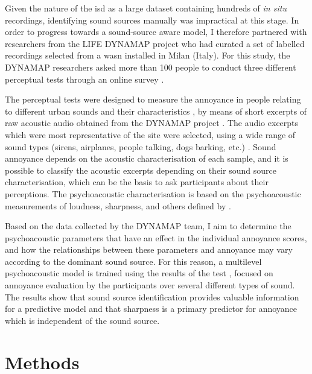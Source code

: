 Given the nature of the \gls{isd} as a large dataset containing hundreds of \emph{in situ} recordings, identifying sound sources manually was impractical at this stage. In order to progress towards a sound-source aware model, I therefore partnered with researchers from the LIFE DYNAMAP project who had curated a set of labelled recordings selected from a \gls{wasn} installed in Milan (Italy). For this study, the DYNAMAP researchers asked more than 100 people to conduct three different perceptual tests through an online survey \citep{AlsinaPages2021Perceptual}. 

The perceptual tests were designed to measure the annoyance in people relating to different urban sounds and their characteristics \citep{LabairuTrenchs2018Noise,AlsinaPages2021Perceptual}, by means of short excerpts of raw acoustic audio obtained from the DYNAMAP project \citep{Sevillano2016DYNAMAP}. The audio excerpts which were most representative of the site were selected, using a wide range of sound types (sirens, airplanes, people talking, dogs barking, etc.) \citep{Alias2020Aggregate,Alias2020WASN}. Sound annoyance depends on the acoustic characterisation of each sample, and it is possible to classify the acoustic excerpts depending on their sound source characterisation, which can be the basis to ask participants about their perceptions. The psychoacoustic characterisation is based on the psychoacoustic measurements of loudness, sharpness, and others defined by \citet{PsychoacousticsfactsmodelsZwicker}.

Based on the data collected by the DYNAMAP team, I aim to determine the psychoacoustic parameters that have an effect in the individual annoyance scores, and how the relationships between these parameters and annoyance may vary according to the dominant sound source. For this reason, a multilevel psychoacoustic model is trained using the results of the  test \citep{IRB2015Method}, focused on annoyance evaluation by the participants over several different types of sound. The results show that sound source identification provides valuable information for a predictive model and that sharpness is a primary predictor for annoyance which is independent of the sound source.


\section{Methods}

